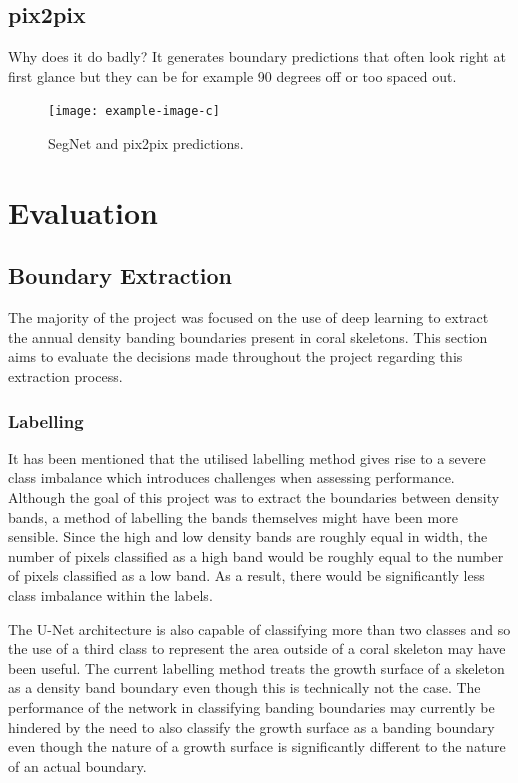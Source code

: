 \subsection{pix2pix}

Why does it do badly? It generates boundary predictions that often look right at first glance but they can be for example 90 degrees off or too spaced out.

\begin{figure}[t]
    \centering
    \texttt{[image: example-image-c]}
    \caption{SegNet and pix2pix predictions.}
\end{figure}

\section{Evaluation}

\subsection{Boundary Extraction}

The majority of the project was focused on the use of deep learning to extract the annual density banding boundaries present in coral skeletons. This section aims to evaluate the decisions made throughout the project regarding this extraction process.

\subsubsection{Labelling}

It has been mentioned that the utilised labelling method gives rise to a severe class imbalance which introduces challenges when assessing performance. Although the goal of this project was to extract the boundaries between density bands, a method of labelling the bands themselves might have been more sensible. Since the high and low density bands are roughly equal in width, the number of pixels classified as a high band would be roughly equal to the number of pixels classified as a low band. As a result, there would be significantly less class imbalance within the labels.

The U-Net architecture is also capable of classifying more than two classes and so the use of a third class to represent the area outside of a coral skeleton may have been useful. The current labelling method treats the growth surface of a skeleton as a density band boundary even though this is technically not the case. The performance of the network in classifying banding boundaries may currently be hindered by the need to also classify the growth surface as a banding boundary even though the nature of a growth surface is significantly different to the nature of an actual boundary.

